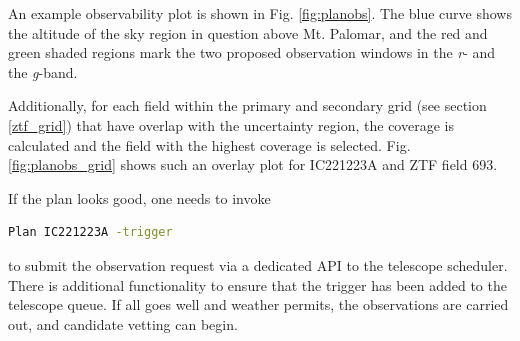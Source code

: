 \documentclass[
    a4paper, %
    fontsize=10pt, %
    twoside=true, %
    numbers=noenddot, %
    fontmethod=tex,
]{kaobook}
\begin{document}
An example observability plot is shown in Fig. \ref{fig:planobs}. The blue curve shows the altitude of the sky region in question above Mt. Palomar, and the red and green shaded regions mark the two proposed observation windows in the \textit{r}- and the \textit{g}-band.

Additionally, for each field within the primary and secondary grid (see section \ref{ztf_grid}) that have overlap with the uncertainty region, the coverage is calculated and the field with the highest coverage is selected. Fig. \ref{fig:planobs_grid} shows such an overlay plot for IC221223A and ZTF field 693.

If the plan looks good, one needs to invoke
\begin{lstlisting}[language=bash,style=kaolstplain]
Plan IC221223A -trigger
\end{lstlisting} 
to submit the observation request via a dedicated API to the telescope scheduler. There is additional functionality to ensure that the trigger has been added to the telescope queue. If all goes well and weather permits, the observations are carried out, and candidate vetting can begin.
\end{document}
